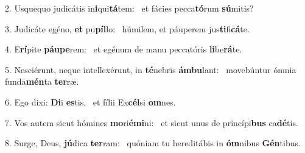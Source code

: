 2. Usquequo judicátis in\textbf{i}qui\textbf{tá}tem: \ast\  et fácies pecca\textbf{tó}rum \textbf{sú}mitis?\

3. Judicáte egéno, \textbf{et} pu\textbf{píl}lo: \ast\  húmilem, et páuperem jus\textbf{ti}fi\textbf{cá}te.\

4. E\textbf{rí}pite \textbf{páu}\textbf{pe}rem: \ast\  et egénum de manu peccatóris \textbf{li}be\textbf{rá}te.\

5. Nesciérunt, neque intellexérunt, in \textbf{té}nebris \textbf{ám}\textbf{bu}lant: \ast\  movebúntur ómnia funda\textbf{mén}ta \textbf{ter}ræ.\

6. Ego dixi: \textbf{Di}i \textbf{es}tis, \ast\  et fílii Ex\textbf{cél}si \textbf{om}nes.\

7. Vos autem sicut hómines \textbf{mo}ri\textbf{é}\textbf{mi}ni: \ast\  et sicut unus de princípi\textbf{bus} ca\textbf{dé}tis.\

8. Surge, Deus, \textbf{jú}dica \textbf{ter}ram: \ast\  quóniam tu hereditábis in \textbf{óm}nibus \textbf{Gén}tibus.\

